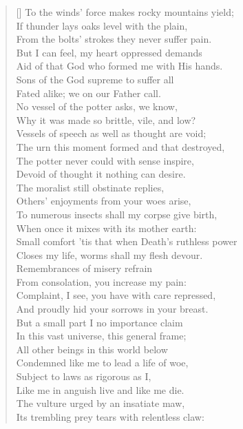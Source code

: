\begin{verse}[\versewidth]
To the winds' force makes rocky mountains yield;\\
If thunder lays oaks level with the plain,\\
From the bolts' strokes they never suffer pain.\\
But I can feel, my heart oppressed demands\\
Aid of that God who formed me with His hands.\\
Sons of the God supreme to suffer all\\
Fated alike; we on our Father call.\\
No vessel of the potter asks, we know,\\
Why it was made so brittle, vile, and low?\\
Vessels of speech as well as thought are void;\\
The urn this moment formed and that destroyed,\\
The potter never could with sense inspire,\\
Devoid of thought it nothing can desire.\\
The moralist still obstinate replies,\\
Others' enjoyments from your woes arise,\\
To numerous insects shall my corpse give birth,\\
When once it mixes with its mother earth:\\
Small comfort 'tis that when Death's ruthless power\\
Closes my life, worms shall my flesh devour.\\
Remembrances of misery refrain\\
From consolation, you increase my pain:\\
Complaint, I see, you have with care repressed,\\
And proudly hid your sorrows in your breast.\\
But a small part I no importance claim\\
In this vast universe, this general frame;\\
All other beings in this world below\\
Condemned like me to lead a life of woe,\\
Subject to laws as rigorous as I,\\
Like me in anguish live and like me die.\\
The vulture urged by an insatiate maw,\\
Its trembling prey tears with relentless claw:\\

\end{verse}
